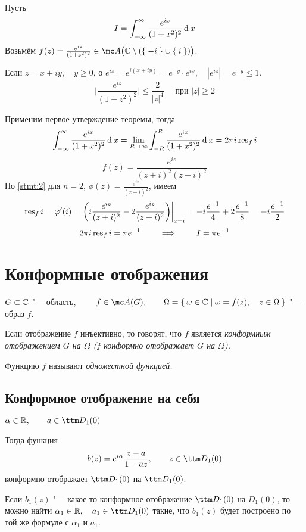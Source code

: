 \begin{eg}
	Пусть
	$$ I = \int_{-\infty}^\infty \frac{e^{ix}}{(1 + x^2)^2}\operatorname{d}^{} x $$
	Возьмём $ f(z) = \frac{e^{iz}}{(1 + z^2)^2} \in \mc A \big( \Co \setminus (\set{-i} \cup \set i) \big) $.

	Если $ z = x + iy, \quad y \ge 0 $, о $ e^{iz} = e^{i(x + iy)} = e^{-y} \cdot e^{ix}, \quad |e^{iz}| = e^{-y} \le 1 $.
	$$ \bigg| \frac{e^{iz}}{(1 + z^2)^2} \bigg| \le \frac2{|z|^4} \quad \text{ при } |z| \ge 2 $$

	Применим первое утверждение теоремы, тогда
	$$ \int_{-\infty}^\infty \frac{e^{ix}}{(1 + x^2)^2}\operatorname{d}^{} x = \lim\limits_{R \to \infty} \int_{-R}^R \frac{e^{ix}}{(1 + x^2)^2} \operatorname{d}^{} x = 2\pi i \operatorname{res}_f i $$
	$$ f(z) = \frac{e^{iz}}{(z + i)^2(z - i)^2} $$
	По \autoref{stmt:2} для $ n = 2 $, $ \phi(z) = \frac{e^{iz}}{(z + i)^2} $, имеем
	$$ \operatorname{res}_f i = \varphi'(i) = \bigg( i \frac{e^{iz}}{(z + i)^2} - 2\frac{e^{iz}}{(z + i)^2} \bigg) \bigg|_{z = i} = -i \frac{e^{-1}}4 + 2 \frac{e^{-1}}8 = -i \frac{e^{-1}}2 $$
	$$ 2\pi i \operatorname{res}_f i = \pi e^{-1} \qquad \implies \qquad I = \pi e^{-1} $$
\end{eg}

\section{Конформные отображения}

\begin{definition}
	$ G \subset \mathbb{C} $ "--- область, $ \qquad f \in \mc A(G), \qquad \Omega = \set{\omega \in \Co \mid \omega = f(z), \quad z \in \Omega} $ "--- образ $ f $.

	Если отображение $ f $ инъективно, то говорят, что $ f $ является \it{конформным отображением} $ G $ на $ \Omega $ ($ f $ \it{конформно отображает} $ G $ на $ \Omega $).

	Функцию $ f $ называют \it{одноместной функцией}.
\end{definition}

\subsection{Конформное отображение  на себя}

\begin{theorem}
	$ \alpha \in \R, \qquad a \in \ttm D_1(0) $

	Тогда функция
	$$ b(z) = e^{i\alpha} \frac{z - a}{1 - \ol az}, \qquad z \in \ttm D_1(0) $$
	конформно отображает $ \ttm D_1(0) $ на $ \ttm D_1(0) $.

	Если $ b_1(z) $ "--- какое-то конформное отображение $ \ttm D_1(0) $ на $ D_1(0) $, то можно найти $ \alpha_1 \in \R, \quad a_1 \in \ttm D_1(0) $ такие, что $ b_1(z) $ будет построено по той же формуле с $ \alpha_1 $ и $ a_1 $.
\end{theorem}

